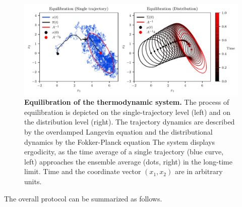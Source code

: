 \documentclass[prx,onecolumn,floatfix,longbibliography,notitlepage, nofootinbib]{revtex4-1}
\begin{document}
\begin{figure}
    \centering
    \includegraphics[width=0.9\linewidth]{figures/FIG2.pdf}
    \caption{\textbf{Equilibration of the thermodynamic system.} The process of equilibration is depicted on the single-trajectory level (left) and on the distribution level (right). The trajectory dynamics are described by the overdamped Langevin equation and the distributional dynamics by the Fokker-Planck equation \cite{fokker1914mittlere} The system displays ergodicity, as the time average of a single trajectory (blue curve, left) approaches the ensemble average (dots, right) in the long-time limit. Time and the coordinate vector $(x_1,x_2)$ are in arbitrary units.}
    \label{fig:Ergodicity}
\end{figure}


The overall protocol can be summarized as follows.
\end{document}
